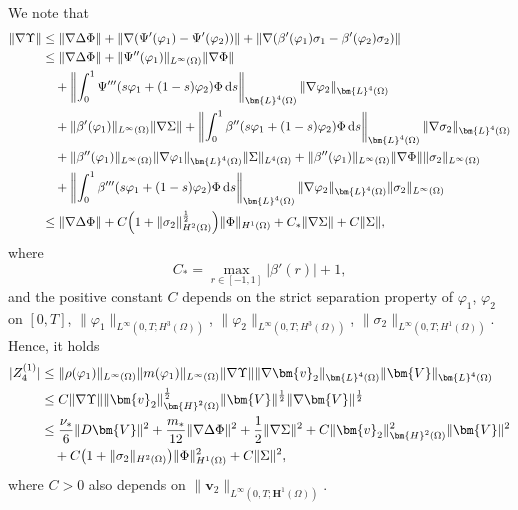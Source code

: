 \documentclass[11pt,reqno]{amsart}
\def\d{{\rm d}}
\def\H{\bm{H}}
\def\L{\bm{L}}
\def\vv{\bm{v}}
\begin{document}
%
We note that
%
\begin{align}
\|\nabla \Upsilon\|
&\leq \|\nabla \Delta\Phi \|+ \|\nabla (\Psi'(\varphi_1)-\Psi'(\varphi_2))\|+ \|\nabla (\beta'(\varphi_1) \sigma_1-\beta'(\varphi_2) \sigma_2)\|
\notag\\
&\leq \|\nabla \Delta \Phi \| + \|\Psi''(\varphi_1)\|_{L^\infty(\Omega)}\|\nabla \Phi\|
\notag\\
&\quad +\left\|\int_0^1\Psi'''(s\varphi_1+(1-s)\varphi_2)\Phi\,\d s\right\|_{\L^4(\Omega)}\|\nabla \varphi_2\|_{\L^4(\Omega)}
\notag\\
&\quad +\|\beta'(\varphi_1)\|_{L^\infty(\Omega)}\|\nabla \Sigma\|
+ \left\|\int_0^1\beta''(s\varphi_1+(1-s)\varphi_2)\Phi\,\d s\right\|_{\L^4(\Omega)}\|\nabla \sigma_2\|_{\L^4(\Omega)}
\notag\\
&\quad + \|\beta''(\varphi_1)\|_{L^\infty(\Omega)}\|\nabla \varphi_1\|_{\L^4(\Omega)}\|\Sigma\|_{L^4(\Omega)}
+ \|\beta''(\varphi_1)\|_{L^\infty(\Omega)}\|\nabla \Phi\|\|\sigma_2\|_{L^\infty(\Omega)}
\notag\\
&\quad + \left\|\int_0^1\beta'''(s\varphi_1+(1-s)\varphi_2)\Phi\,\d s\right\|_{\L^4(\Omega)} \|\nabla \varphi_2\|_{\L^4(\Omega)}\|\sigma_2\|_{L^\infty(\Omega)}
\notag\\
&\leq \|\nabla \Delta\Phi \| + C\Big(1+\|\sigma_2\|_{H^2(\Omega)}^\frac12\Big)\|\Phi\|_{H^1(\Omega)} + C_*\|\nabla\Sigma\| + C\|\Sigma\|,
\label{dif-mu}
\end{align}
%
where
$$C_*=\max_{r\in [-1,1]}|\beta'(r)|+1,$$
and the positive constant $C$ depends on the strict separation property of $\varphi_1$, $\varphi_2$ on $[0,T]$, $\|\varphi_1\|_{L^\infty(0,T;H^3(\Omega))}$, $\|\varphi_2\|_{L^\infty(0,T;H^3(\Omega))}$, $\|\sigma_2\|_{L^\infty(0,T;H^1(\Omega))}$.
Hence, it holds
%
\begin{align*}
 |Z_4^{(1)}|
 &\leq \|\rho(\varphi_1)\|_{L^\infty(\Omega)}\|m(\varphi_1)\|_{L^\infty(\Omega)} \|\nabla\Upsilon\| \|\nabla\vv_2\|_{\L^4(\Omega)} \|\bm{V}\|_{\L^4(\Omega)}
 \notag\\
 &\leq  C\|\nabla \Upsilon\| \|\vv_2\|_{\H^2(\Omega)}^\frac12 \|\bm{V}\|^\frac12 \|\nabla \bm{V}\|^\frac12
 \notag\\
 &\leq \frac{\nu_*}{6}\|D\bm{V}\|^2
 + \frac{m_*}{12} \|\nabla \Delta \Phi\|^2
 + \frac{1}{2}\|\nabla \Sigma\|^2
 +C \|\vv_2\|_{\H^2(\Omega)}^2\|\bm{V}\|^2
 \notag\\
 &\quad +C\big(1+\|\sigma_2\|_{H^2(\Omega)}\big) \|\Phi\|_{H^1(\Omega)}^2
 + C\|\Sigma\|^2,
\end{align*}
%
where $C>0$ also depends on $\|\vv_2\|_{L^\infty(0,T;\H^1(\Omega))}$.
\end{document}
